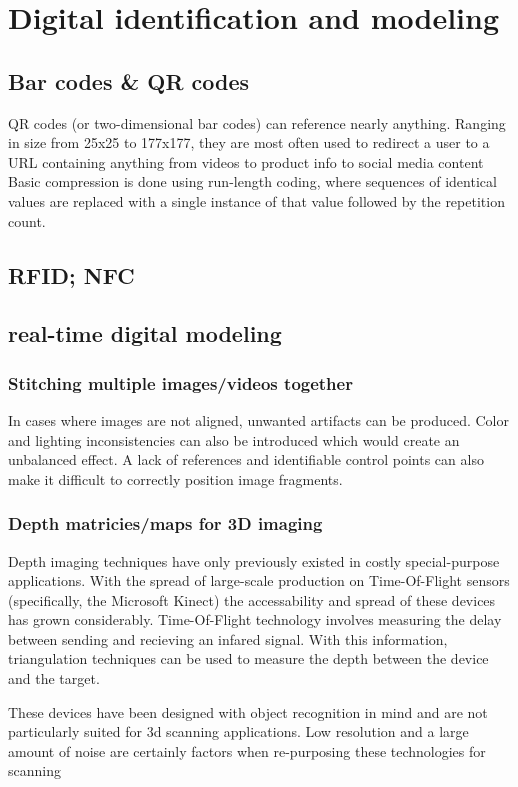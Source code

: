 \documentclass[a4paper,12pt]{report}
\begin{document}
\section{Digital identification and modeling}
\subsection{Bar codes \& QR codes}
QR codes (or two-dimensional bar codes) can reference nearly anything. Ranging in size from 25x25 to 177x177, they are most often used to redirect a user to a URL containing anything from videos to product info to social media content \cite{6182398}
Basic compression is done using run-length coding, where sequences of identical values are replaced with a single instance of that value followed by the repetition count. \cite{6182398}
\subsection{RFID; NFC}
\cite{5340296}
\subsection{real-time digital modeling}
\subsubsection{Stitching multiple images/videos together}
In cases where images are not aligned, unwanted artifacts can be produced. Color and lighting inconsistencies can also be introduced which would create an unbalanced effect. A lack of references and identifiable control points can also make it difficult to correctly position image fragments. \cite{4359344}

\cite{5397590}
\subsubsection{Depth matricies/maps for 3D imaging}
Depth imaging techniques have only previously existed in costly special-purpose applications. With the spread of large-scale production on Time-Of-Flight sensors (specifically, the Microsoft Kinect) the accessability and spread of these devices has grown considerably. Time-Of-Flight technology involves measuring the delay between sending and recieving an infared signal. With this information, triangulation techniques can be used to measure the depth between the device and the target. 

These devices have been designed with object recognition in mind and are not particularly suited for 3d scanning applications. Low resolution and a large amount of noise are certainly factors when re-purposing these technologies for scanning\cite{6296662} 
\end{document}
